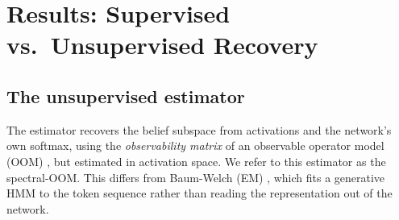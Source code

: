 \documentclass[11pt]{article}
\begin{document}
\section{Results: Supervised vs.\ Unsupervised Recovery}

\subsection{The unsupervised estimator}
\label{sec:estimator}

The estimator recovers the belief subspace from activations and the network's own
softmax, using the \emph{observability matrix} of an observable operator model (OOM) \cite{jaeger2000},
but estimated in activation space. We refer to this estimator as the spectral-OOM.
This differs from Baum-Welch (EM) \cite{baum1970}, which fits a generative HMM to the token
sequence rather than reading the representation out of the network.
\end{document}
